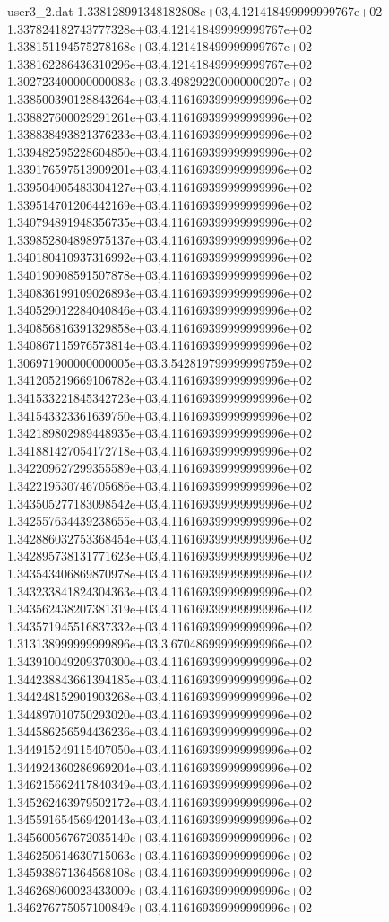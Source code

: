 \begin{filecontents}{user3_2.dat}
1.338128991348182808e+03,4.121418499999999767e+02
1.337824182743777328e+03,4.121418499999999767e+02
1.338151194575278168e+03,4.121418499999999767e+02
1.338162286436310296e+03,4.121418499999999767e+02
1.302723400000000083e+03,3.498292200000000207e+02
1.338500390128843264e+03,4.116169399999999996e+02
1.338827600029291261e+03,4.116169399999999996e+02
1.338838493821376233e+03,4.116169399999999996e+02
1.339482595228604850e+03,4.116169399999999996e+02
1.339176597513909201e+03,4.116169399999999996e+02
1.339504005483304127e+03,4.116169399999999996e+02
1.339514701206442169e+03,4.116169399999999996e+02
1.340794891948356735e+03,4.116169399999999996e+02
1.339852804898975137e+03,4.116169399999999996e+02
1.340180410937316992e+03,4.116169399999999996e+02
1.340190908591507878e+03,4.116169399999999996e+02
1.340836199109026893e+03,4.116169399999999996e+02
1.340529012284040846e+03,4.116169399999999996e+02
1.340856816391329858e+03,4.116169399999999996e+02
1.340867115976573814e+03,4.116169399999999996e+02
1.306971900000000005e+03,3.542819799999999759e+02
1.341205219669106782e+03,4.116169399999999996e+02
1.341533221845342723e+03,4.116169399999999996e+02
1.341543323361639750e+03,4.116169399999999996e+02
1.342189802989448935e+03,4.116169399999999996e+02
1.341881427054172718e+03,4.116169399999999996e+02
1.342209627299355589e+03,4.116169399999999996e+02
1.342219530746705686e+03,4.116169399999999996e+02
1.343505277183098542e+03,4.116169399999999996e+02
1.342557634439238655e+03,4.116169399999999996e+02
1.342886032753368454e+03,4.116169399999999996e+02
1.342895738131771623e+03,4.116169399999999996e+02
1.343543406869870978e+03,4.116169399999999996e+02
1.343233841824304363e+03,4.116169399999999996e+02
1.343562438207381319e+03,4.116169399999999996e+02
1.343571945516837332e+03,4.116169399999999996e+02
1.313138999999999896e+03,3.670486999999999966e+02
1.343910049209370300e+03,4.116169399999999996e+02
1.344238843661394185e+03,4.116169399999999996e+02
1.344248152901903268e+03,4.116169399999999996e+02
1.344897010750293020e+03,4.116169399999999996e+02
1.344586256594436236e+03,4.116169399999999996e+02
1.344915249115407050e+03,4.116169399999999996e+02
1.344924360286969204e+03,4.116169399999999996e+02
1.346215662417840349e+03,4.116169399999999996e+02
1.345262463979502172e+03,4.116169399999999996e+02
1.345591654569420143e+03,4.116169399999999996e+02
1.345600567672035140e+03,4.116169399999999996e+02
1.346250614630715063e+03,4.116169399999999996e+02
1.345938671364568108e+03,4.116169399999999996e+02
1.346268060023433009e+03,4.116169399999999996e+02
1.346276775057100849e+03,4.116169399999999996e+02

\end{filecontents}
